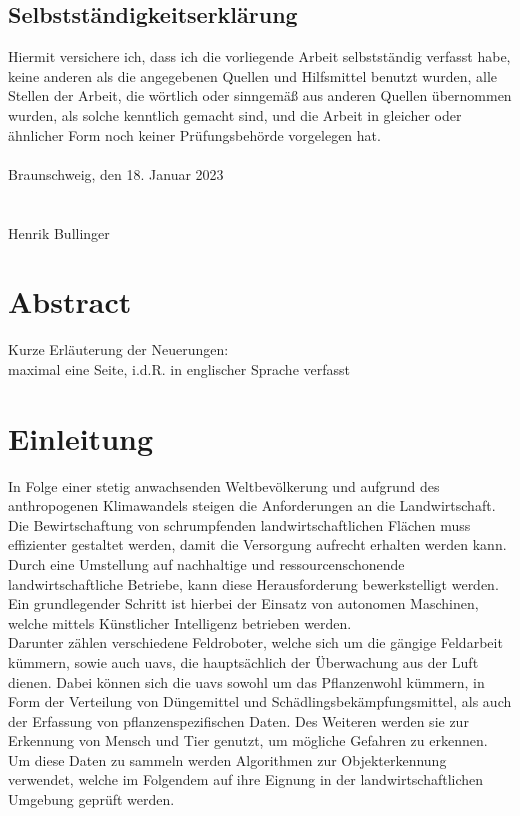 \documentclass[12pt,
titlepage,
a4paper,
oneside,     %
openany,     %
listof=totoc,  %
numbers = noenddot, %
bibliography=totoc,    %
headsepline, %
]{scrbook} %
\title{\varTitel}
\date{\today}
\author{\varAuthor}
\begin{document}
\frontmatter
{}





\newpage
\section*{Selbstständigkeitserklärung}
Hiermit versichere ich, dass ich die vorliegende Arbeit selbstständig verfasst habe, keine anderen als die angegebenen Quellen und Hilfsmittel benutzt wurden, alle Stellen der Arbeit, die wörtlich oder sinngemäß aus anderen Quellen übernommen wurden, als solche kenntlich gemacht sind, und die Arbeit in gleicher oder ähnlicher Form noch keiner Prüfungsbehörde vorgelegen hat. \\
\\
Braunschweig, den 18. Januar 2023 \\
\\
\\
Henrik Bullinger \\



\listoffigures

\listoftables

\printacronyms

\newpage
\chapter*{Abstract}
Kurze Erläuterung der Neuerungen:\\
maximal eine Seite, i.d.R. in englischer Sprache verfasst

\newpage
\tableofcontents

\mainmatter
\chapter{Einleitung}
\label{cha:einleitung}

In Folge einer stetig anwachsenden Weltbevölkerung und aufgrund des anthropogenen Klimawandels steigen die Anforderungen an die Landwirtschaft. Die Bewirtschaftung von schrumpfenden landwirtschaftlichen Flächen muss effizienter gestaltet werden, damit die Versorgung aufrecht erhalten werden kann. Durch eine Umstellung auf nachhaltige und ressourcenschonende landwirtschaftliche Betriebe, kann diese Herausforderung bewerkstelligt werden. Ein grundlegender Schritt ist hierbei der Einsatz von autonomen Maschinen, welche mittels Künstlicher Intelligenz betrieben werden. \\
Darunter zählen verschiedene Feldroboter, welche sich um die gängige Feldarbeit kümmern, sowie auch \acp{uav}, die hauptsächlich der Überwachung aus der Luft dienen. Dabei können sich die \acp{uav} sowohl um das Pflanzenwohl kümmern, in Form der Verteilung von Düngemittel und Schädlingsbekämpfungsmittel, als auch der Erfassung von pflanzenspezifischen Daten. Des Weiteren werden sie zur Erkennung von Mensch und Tier genutzt, um mögliche Gefahren zu erkennen. Um diese Daten zu sammeln werden Algorithmen zur Objekterkennung verwendet, welche im Folgendem auf ihre Eignung in der landwirtschaftlichen Umgebung geprüft werden. \\
\end{document}
